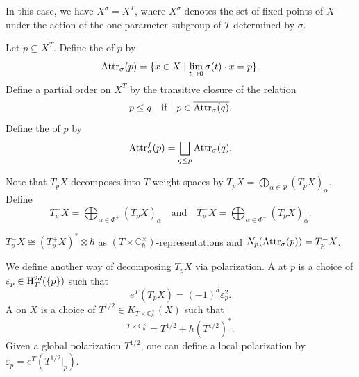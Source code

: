 In this case, we have $X^\sigma = X^T$, where $X^\sigma$ denotes the set of fixed points of $X$ under the action of the one parameter subgroup of $T$ determined by $\sigma$.

Let $p \subseteq X^T$. Define the  of $p$ by
\begin{equation*}
    \mathrm{Attr}_\sigma(p) = \{ x \in X \mid \lim_{t \to 0} \sigma(t) \cdot x = p \}.
\end{equation*}
Define a partial order on $X^T$ by the transitive closure of the relation
\begin{equation*}
    p \leq q \quad \text{if} \quad p \in \overline{\mathrm{Attr}_\sigma(q)}.
\end{equation*}
Define the  of $p$ by
\begin{equation*}
    \mathrm{Attr}^f_\sigma(p) = \bigsqcup_{q \leq p}\mathrm{Attr}_\sigma(q).
\end{equation*}

Note that $T_pX$ decomposes into $T$-weight spaces by $T_pX = \bigoplus_{\alpha \in \Phi} (T_pX)_\alpha$. Define
\begin{equation*}
    T_p^+X = \bigoplus_{\alpha \in \Phi^+} (T_pX)_\alpha \quad \text{and} \quad T_p^-X = \bigoplus_{\alpha \in \Phi^-} (T_pX)_\alpha.
\end{equation*}

\begin{proposition}{}
    $T_p^-X \cong (T_p^+X)^* \otimes \hbar$ as $(T \times \mathbb{C}^\times_\hbar)$-representations and $N_p(\mathrm{Attr}_\sigma(p)) = T_p^-X$.
\end{proposition}

We define another way of decomposing $T_pX$ via polarization. A  at $p$ is a choice of $\varepsilon_p \in \mathrm{H}_T^{2d}(\{p\})$ such that
\begin{equation*}
    e^T(T_pX) = (-1)^d \varepsilon_p^2.
\end{equation*}
A  on $X$ is a choice of $T^{1/2} \in K_{T \times \mathbb{C}^\times_\hbar}(X)$ such that
\begin{equation*}
    [TX]^{T \times \mathbb{C}^\times_\hbar} = T^{1/2} + \hbar(T^{1/2})^*.
\end{equation*}
Given a global polarization $T^{1/2}$, one can define a local polarization by $\varepsilon_p = e^T(T^{1/2}|_p)$.

